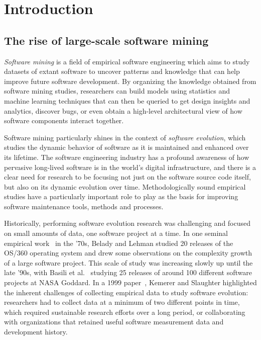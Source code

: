 \chapter{Introduction}

\section{The rise of large-scale software mining}

\emph{Software mining} is a field of empirical software engineering which aims
to study datasets of extant software to uncover patterns and knowledge that can
help improve future software development. By organizing the knowledge obtained
from software mining studies, researchers can build models using statistics and
machine learning techniques that can then be queried to get design insights and
analytics, discover bugs, or even obtain a high-level architectural view of
how software components interact together.

Software mining particularly shines in the context of \emph{software
evolution}, which studies the dynamic behavior of software as it is maintained
and enhanced over its lifetime. The software engineering industry has a
profound awareness of how pervasive long-lived software is in the world's
digital infrastructure, and there is a clear need for research to be focusing
not just on the software source code itself, but also on its dynamic evolution
over time. Methodologically sound empirical studies have a particularly
important role to play as the basis for improving software maintenance tools,
methods and processes.

Historically, performing software evolution research was challenging and
focused on small amounts of data, one software project at a time. In one
seminal empirical work~\cite{belady1976model} in the '70s, Belady and Lehman
studied 20 releases of the OS/360 operating system and drew some observations
on the complexity growth of a large software project. This scale of study was
increasing slowly up until the late '90s, with Basili et
al.~\cite{basili1996understanding} studying 25 releases of around 100 different
software projects at NASA Goddard.  In a 1999
paper~\cite{kemerer1999empirical}, Kemerer and Slaughter highlighted the
inherent challenges of collecting empirical data to study software evolution:
researchers had to collect data at a minimum of two different points in time,
which required sustainable research efforts over a long period, or
collaborating with organizations that retained useful software measurement data
and development history.


